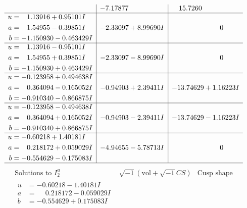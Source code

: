 \documentclass[1p]{elsarticle_modified}
\theoremstyle{definition}
\newcommand{\I}{\sqrt{-1}}
\begin{document}
$$\begin{array}{c|c|c}
 & -7.17877\phantom{ +0.000000I} & \phantom{-}15.7260\phantom{ +0.000000I} \\ \hline\begin{aligned}
u &= \phantom{-}1.13916 + 0.95101 I \\
a &= \phantom{-}1.54955 - 0.39851 I \\
b &= -1.150930 - 0.463429 I\end{aligned}
 & -2.33097 + 8.99690 I & \phantom{-0.000000 } 0 \\ \hline\begin{aligned}
u &= \phantom{-}1.13916 - 0.95101 I \\
a &= \phantom{-}1.54955 + 0.39851 I \\
b &= -1.150930 + 0.463429 I\end{aligned}
 & -2.33097 - 8.99690 I & \phantom{-0.000000 } 0 \\ \hline\begin{aligned}
u &= -0.123958 + 0.494638 I \\
a &= \phantom{-}0.364094 - 0.165052 I \\
b &= -0.910340 - 0.866875 I\end{aligned}
 & -0.94903 + 2.39411 I & -13.74629 + 1.16223 I \\ \hline\begin{aligned}
u &= -0.123958 - 0.494638 I \\
a &= \phantom{-}0.364094 + 0.165052 I \\
b &= -0.910340 + 0.866875 I\end{aligned}
 & -0.94903 - 2.39411 I & -13.74629 - 1.16223 I \\ \hline\begin{aligned}
u &= -0.60218 + 1.40181 I \\
a &= \phantom{-}0.218172 + 0.059029 I \\
b &= -0.554629 - 0.175083 I\end{aligned}
 & -4.94655 - 5.78713 I & \phantom{-0.000000 } 0\\
 \hline 
 \end{array}$$\newpage$$\begin{array}{c|c|c}  
\text{Solutions to }I^u_{2}& \I (\text{vol} + \sqrt{-1}CS) & \text{Cusp shape}\\
 \hline 
\begin{aligned}
u &= -0.60218 - 1.40181 I \\
a &= \phantom{-}0.218172 - 0.059029 I \\
b &= -0.554629 + 0.175083 I\end{aligned}

\end{array}$$
\end{document}
